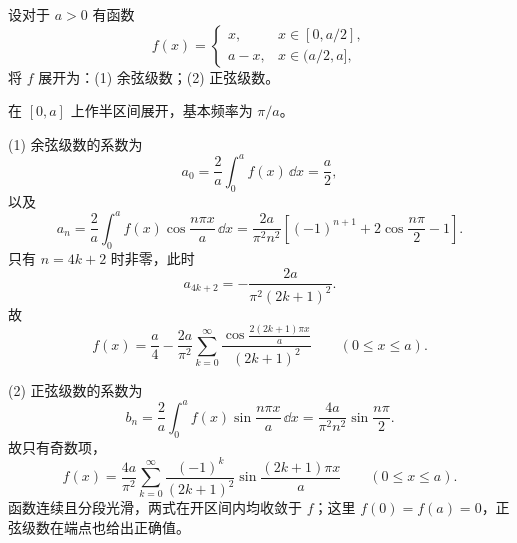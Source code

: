 \begin{xexercise}[2]
设对于 $a>0$ 有函数
  \[
    f(x)=\begin{cases}
      x,&x\in[0,a/2],\\
      a-x,&x\in(a/2,a],
    \end{cases}
  \]
  将 $f$ 展开为：(1) 余弦级数；(2) 正弦级数。
\end{xexercise}
\begin{xsolution}
在 $[0,a]$ 上作半区间展开，基本频率为 $\pi/a$。

(1) 余弦级数的系数为
\[
  a_0=\frac2a\int_0^af(x)\,\dd x=\frac a2,
\]
以及
\[
  a_n=\frac2a\int_0^af(x)\cos\frac{n\pi x}{a}\,\dd x
  =\frac{2a}{\pi^2n^2}
  \left[(-1)^{n+1}+2\cos\frac{n\pi}{2}-1\right].
\]
只有 $n=4k+2$ 时非零，此时
\[
  a_{4k+2}=-\frac{2a}{\pi^2(2k+1)^2}.
\]
故
\[
  \boxed{\displaystyle
  f(x)=\frac{a}{4}-
  \frac{2a}{\pi^2}
  \sum_{k=0}^{\infty}
  \frac{\cos\frac{2(2k+1)\pi x}{a}}{(2k+1)^2}}
  \qquad(0\le x\le a).
\]

(2) 正弦级数的系数为
\[
  b_n=\frac2a\int_0^af(x)\sin\frac{n\pi x}{a}\,\dd x
  =\frac{4a}{\pi^2n^2}\sin\frac{n\pi}{2}.
\]
故只有奇数项，
\[
  \boxed{\displaystyle
  f(x)=\frac{4a}{\pi^2}
  \sum_{k=0}^{\infty}
  \frac{(-1)^k}{(2k+1)^2}
  \sin\frac{(2k+1)\pi x}{a}}
  \qquad(0\le x\le a).
\]
函数连续且分段光滑，两式在开区间内均收敛于 $f$；这里 $f(0)=f(a)=0$，正弦级数在端点也给出正确值。
\end{xsolution}


